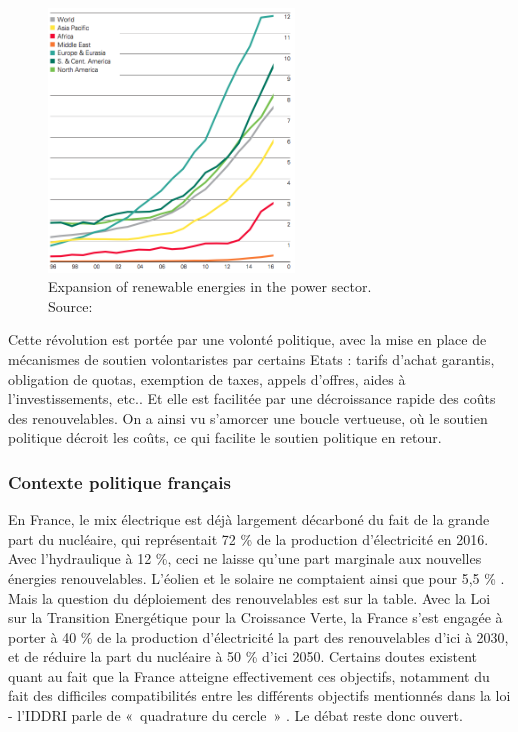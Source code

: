 \begin{figure}[!ht]
	\centering
	\includegraphics[height=7cm]{figures/BP_ENR_Expansion.png}
	\caption[Expansion of renewable energies in the power sector]{Expansion of renewable energies in the power sector.\\Source: \citet[p. 43]{BP2017}}
\end{figure}

Cette révolution est portée par une volonté politique, avec la mise en place de mécanismes de soutien volontaristes par certains Etats : tarifs d’achat garantis, obligation de quotas, exemption de taxes, appels d’offres, aides à l’investissements, etc.\citep{EuropeanCommission2013}. Et elle est facilitée par une décroissance rapide des coûts des renouvelables. On a ainsi vu s’amorcer une boucle vertueuse, où le soutien politique décroit les coûts, ce qui facilite le soutien politique en retour.

\subsubsection{Contexte politique français}
En France, le mix électrique est déjà largement décarboné du fait de la grande part du nucléaire, qui représentait 72 \% de la production d’électricité en 2016. Avec l’hydraulique à 12 \%, ceci ne laisse qu’une part marginale aux nouvelles énergies renouvelables. L’éolien et le solaire ne comptaient ainsi que pour 5,5 \% \citet{RTE2016}. 
Mais la question du déploiement des renouvelables est sur la table. Avec la Loi sur la Transition Energétique pour la Croissance Verte, la France s’est engagée à porter à 40 \% de la production d’électricité la part des renouvelables d’ici à 2030, et de réduire la part du nucléaire à 50 \% d’ici 2050. Certains doutes existent quant au fait que la France atteigne effectivement ces objectifs, notamment du fait des difficiles compatibilités entre les différents objectifs mentionnés dans la loi - l’IDDRI parle de «~quadrature du cercle~» \citep{Rudinger2017}. Le débat reste donc ouvert.

